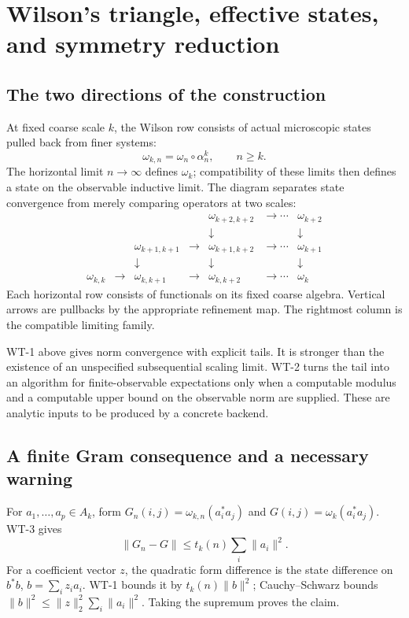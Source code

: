 \section{Wilson's triangle, effective states, and symmetry reduction}

\subsection{The two directions of the construction}

At fixed coarse scale $k$, the Wilson row consists of actual microscopic
states pulled back from finer systems:
\[
 \omega_{k,n}=\omega_n\circ\alpha_n^k,\qquad n\ge k.
\]
The horizontal limit $n\to\infty$ defines $\omega_k$; compatibility of these
limits then defines a state on the observable inductive limit. The diagram
separates state convergence from merely comparing operators at two scales:
\[
\begin{array}{ccccccc}
 &&&&\omega_{k+2,k+2}&\longrightarrow\cdots&\omega_{k+2}\\
 &&&&\downarrow&&\downarrow\\
 &&\omega_{k+1,k+1}&\longrightarrow&\omega_{k+1,k+2}&\longrightarrow\cdots&\omega_{k+1}\\
 &&\downarrow&&\downarrow&&\downarrow\\
 \omega_{k,k}&\longrightarrow&\omega_{k,k+1}&\longrightarrow&\omega_{k,k+2}
 &\longrightarrow\cdots&\omega_k
\end{array}
\]
Each horizontal row consists of functionals on its fixed coarse algebra.
Vertical arrows are pullbacks by the appropriate refinement map. The
rightmost column is the compatible limiting family.

WT-1 above gives norm convergence with explicit tails. It is stronger than
the existence of an unspecified subsequential scaling limit. WT-2 turns the
tail into an algorithm for finite-observable expectations only when a
computable modulus and a computable upper bound on the observable norm are
supplied. These are analytic inputs to be produced by a concrete backend.

\subsection{A finite Gram consequence and a necessary warning}

For $a_1,\ldots,a_p\in A_k$, form
$G_n(i,j)=\omega_{k,n}(a_i^*a_j)$ and
$G(i,j)=\omega_k(a_i^*a_j)$. WT-3 gives
\[
 \|G_n-G\|\le t_k(n)\sum_i\|a_i\|^2.
\]
For a coefficient vector $z$, the quadratic form difference is the
state difference on $b^*b$, $b=\sum_i z_i a_i$. WT-1 bounds it by
$t_k(n)\|b\|^2$; Cauchy--Schwarz bounds
$\|b\|^2\le\|z\|_2^2\sum_i\|a_i\|^2$. Taking the supremum proves the claim.

